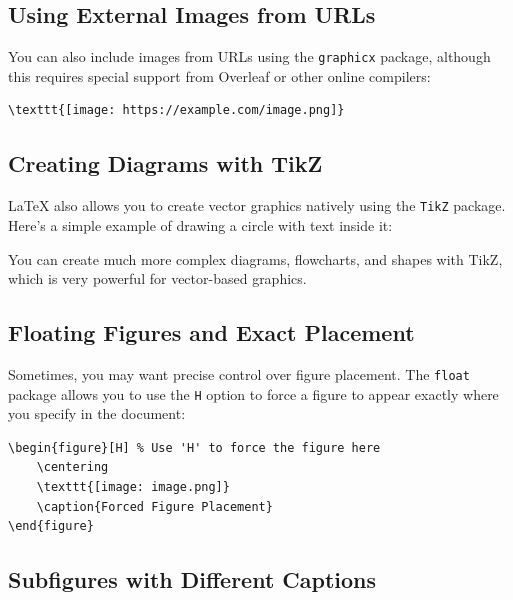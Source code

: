 \documentclass{article}
\begin{document}
\subsection*{Using External Images from URLs}

You can also include images from URLs using the \texttt{graphicx} package, although this requires special support from Overleaf or other online compilers:

\begin{verbatim}
\texttt{[image: https://example.com/image.png]}
\end{verbatim}

\subsection*{Creating Diagrams with TikZ}

LaTeX also allows you to create vector graphics natively using the \texttt{TikZ} package. Here's a simple example of drawing a circle with text inside it:


You can create much more complex diagrams, flowcharts, and shapes with TikZ, which is very powerful for vector-based graphics.

\subsection*{Floating Figures and Exact Placement}

Sometimes, you may want precise control over figure placement. The \texttt{float} package allows you to use the \texttt{H} option to force a figure to appear exactly where you specify in the document:

\begin{verbatim}
\begin{figure}[H] % Use 'H' to force the figure here
    \centering
    \texttt{[image: image.png]}
    \caption{Forced Figure Placement}
\end{figure}
\end{verbatim}

\subsection*{Subfigures with Different Captions}
\end{document}
